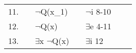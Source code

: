 \documentclass[12pt]{article}
\begin{document}
\begin{table}[H]
\begin{tabular}{|lllllll|}
\multicolumn{1}{|l|}{11.} &                       & $\neg$Q(x\_1)                                                  &  & $\neg$i 8-10                             & \multicolumn{1}{l|}{} &  \\ \cline{2-6}
12.                       &                       & $\neg$Q(x)                                                     &  & $\exists$e 4-11                          &                       &  \\
13.                       &                       & $\exists$x $\neg$Q(x)                                          &  & $\exists$i 12                            &                       &  \\ \hline
\end{tabular}
\end{table}
\end{document}
